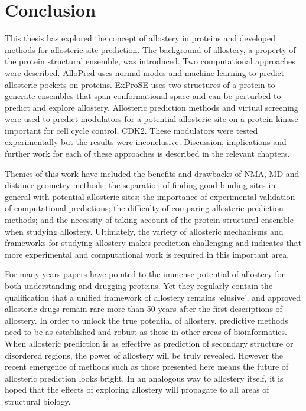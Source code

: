 \chapter{Conclusion}
\label{cha:conclusion}

This thesis has explored the concept of allostery in proteins and developed methods for allosteric site prediction.
The background of allostery, a property of the protein structural ensemble, was introduced.
Two computational approaches were described.
AlloPred uses normal modes and machine learning to predict allosteric pockets on proteins.
ExProSE uses two structures of a protein to generate ensembles that span conformational space and can be perturbed to predict and explore allostery.
Allosteric prediction methods and virtual screening were used to predict modulators for a potential allosteric site on a protein kinase important for cell cycle control, CDK2.
These modulators were tested experimentally but the results were inconclusive.
Discussion, implications and further work for each of these approaches is described in the relevant chapters.

Themes of this work have included the benefits and drawbacks of NMA, MD and distance geometry methods; the separation of finding good binding sites in general with potential allosteric sites; the importance of experimental validation of computational predictions; the difficulty of comparing allosteric prediction methods; and the necessity of taking account of the protein structural ensemble when studying allostery.
Ultimately, the variety of allosteric mechanisms and frameworks for studying allostery makes prediction challenging and indicates that more experimental and computational work is required in this important area.

For many years papers have pointed to the immense potential of allostery for both understanding and drugging proteins.
Yet they regularly contain the qualification that a unified framework of allostery remains `elusive', and approved allosteric drugs remain rare more than 50 years after the first descriptions of allostery.
In order to unlock the true potential of allostery, predictive methods need to be as established and robust as those in other areas of bioinformatics.
When allosteric prediction is as effective as prediction of secondary structure or disordered regions, the power of allostery will be truly revealed.
However the recent emergence of methods such as those presented here means the future of allosteric prediction looks bright.
In an analogous way to allostery itself, it is hoped that the effects of exploring allostery will propagate to all areas of structural biology.
